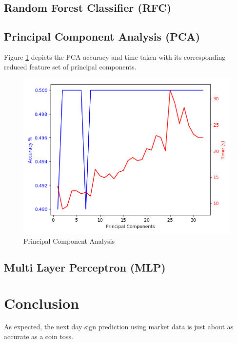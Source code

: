 \documentclass{article}\raggedbottom
\begin{document}
\subsection{Random Forest Classifier (RFC)}
\subsection{Principal Component Analysis (PCA)}
Figure \ref{fig:PCA} depicts the PCA accuracy and time taken with its corresponding reduced feature set of principal components.

\begin{figure}[h!]
	\centering
	\includegraphics[width=\linewidth]{data/PCAT1.png}
	\caption{Principal Component Analysis}
	\label{fig:PCA}
\end{figure}

\subsection{Multi Layer Perceptron (MLP)}


\section{Conclusion}
As expected, the next day sign prediction using market data is just about as accurate as a coin toss.

 

\end{document}
